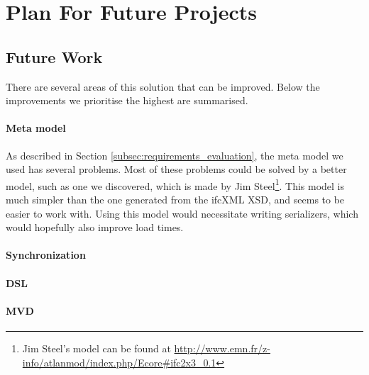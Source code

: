 \section{Plan For Future Projects}
\subsection{Future Work}
\label{sec:future_work}
There are several areas of this solution that can be improved. Below the improvements we prioritise the highest are summarised. 
\paragraph{Meta model}
As described in Section \ref{subsec:requirements_evaluation}, the meta model we used has several problems. Most of these problems could be solved by a better model, such as one we discovered, which is made by Jim Steel\footnote{Jim Steel's model can be found at \url{http://www.emn.fr/z-info/atlanmod/index.php/Ecore#ifc2x3_0.1}}. This model is much simpler than the one generated from the ifcXML XSD, and seems to be easier to work with. Using this model would necessitate writing serializers, which would hopefully also improve load times.
\paragraph{Synchronization}
\paragraph{DSL}
\paragraph{MVD}
